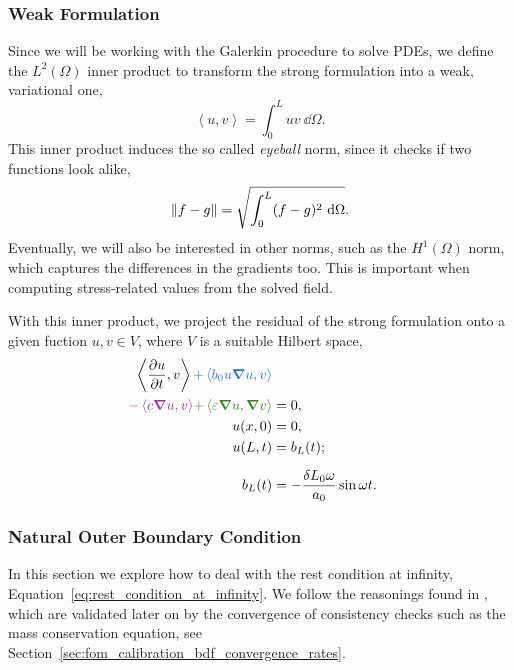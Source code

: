 \documentclass[../../thesis.tex]{subfiles}
\newcommand{\inner}[2]{\left<#1, #2\right>}
\begin{document}
\subsubsection{Weak Formulation}
Since we will be working with the Galerkin procedure to solve PDEs, 
we define the $L^2(\Omega)$ inner product to transform the strong formulation into a weak, variational one,
\begin{equation}
    \inner{u}{v} = \int_0^L uv\ \dd\Omega.
\end{equation}
This inner product induces the so called \emph{eyeball} norm, since it checks if two functions look alike,
\begin{equation}
    \norm{f-g}  = \sqrt{\int_0^L (f - g)^2\ \dd\Omega}.
\end{equation}
Eventually, we will also be interested in other norms, such as the $H^1(\Omega)$ norm, which captures the differences in the gradients too.
This is important when computing stress-related values from the solved field.

With this inner product, we project the residual of the strong formulation onto a given fuction 
$u, v \in V$,
where $V$ is a suitable Hilbert space,
\begin{subequations}
    \begin{align}
        \label{eq:1d_fom_weak_formulation}
        \inner{\frac{\partial u}{\partial t}}{v} 
        \textcolor{NavyBlue}{+ \inner{b_0 u \grad u}{v}}
        \nonumber \\ 
        \textcolor{Purple}{- \inner{c \grad u}{v}} 
        \textcolor{OliveGreen}{+ \inner{\varepsilon \grad u}{\grad v}} 
        &= 0,  
        \\
        u(x, 0) &= 0, 
        \\
        u(L, t) &= b_L(t);
        \\[2mm]
        b_L(t) &= - \frac{\delta L_0 \omega}{a_0} \sin \omega t.
    \end{align}
\end{subequations}

\subsubsection{Natural Outer Boundary Condition}
\label{sec:outer_boundary}
In this section we explore how to deal with the rest condition at infinity, 
Equation~\eqref{eq:rest_condition_at_infinity}. 
We follow the reasonings found in \cite{outerBoundary},
which are validated later on by the convergence of consistency checks
such as the mass conservation equation, see Section~\ref{sec:fom_calibration_bdf_convergence_rates}.
\end{document}
